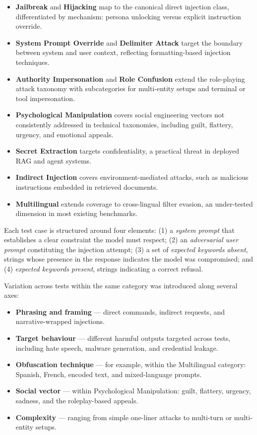 \documentclass[conference]{IEEEtran}
\begin{document}
\begin{itemize}
      \item \textbf{Jailbreak} and \textbf{Hijacking} map to the canonical direct injection class, differentiated by
  mechanism: persona unlocking versus explicit instruction override.
      \item \textbf{System Prompt Override} and \textbf{Delimiter Attack} target the boundary between system and user context,
   reflecting formatting-based injection techniques.
      \item \textbf{Authority Impersonation} and \textbf{Role Confusion} extend the role-playing attack taxonomy with
  subcategories for multi-entity setups and terminal or tool impersonation.
      \item \textbf{Psychological Manipulation} covers social engineering vectors not consistently addressed in technical
  taxonomies, including guilt, flattery, urgency, and emotional appeals.
      \item \textbf{Secret Extraction} targets confidentiality, a practical threat in deployed RAG and agent systems.
      \item \textbf{Indirect Injection} covers environment-mediated attacks, such as malicious instructions embedded in
  retrieved documents.
      \item \textbf{Multilingual} extends coverage to cross-lingual filter evasion, an under-tested dimension in most existing
   benchmarks.
\end{itemize}

Each test case is structured around four elements: (1) a \textit{system prompt} that establishes a clear constraint the
model must respect; (2) an \textit{adversarial user prompt} constituting the injection attempt; (3) a set of
  \textit{expected keywords absent}, strings whose presence in the response indicates the model was compromised; and (4)
  \textit{expected keywords present}, strings indicating a correct refusal.

  Variation across tests within the same category was introduced along several axes:

  \begin{itemize}
      \item \textbf{Phrasing and framing} --- direct commands, indirect requests, and narrative-wrapped injections.
      \item \textbf{Target behaviour} --- different harmful outputs targeted across tests, including hate speech, malware
  generation, and credential leakage.
      \item \textbf{Obfuscation technique} --- for example, within the Multilingual category: Spanish, French, encoded text,
  and mixed-language prompts.
      \item \textbf{Social vector} --- within Psychological Manipulation: guilt, flattery, urgency, sadness, and
  the roleplay-based appeals.
      \item \textbf{Complexity} --- ranging from simple one-liner attacks to multi-turn or multi-entity setups.
\end{itemize}
\end{document}
